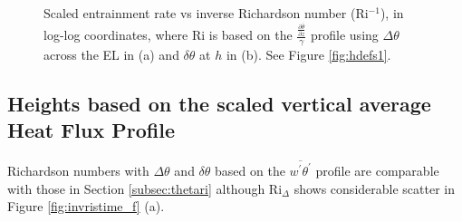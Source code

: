 \begin{figure}[htbp]
\begin{minipage}[b]{0.5\linewidth}
        \\
        \end{minipage}             
\quad
\begin{minipage}[b]{0.5\linewidth}
        \\       
       \end{minipage}
        \caption[Scaled entrainment rate vs inverse Richardson number (i)]{Scaled entrainment rate vs inverse Richardson number (\acs{Ri}$^{-1}$), in log-log coordinates, where \acs{Ri} is based on the $\frac{\frac{\partial \overline{\theta}}{\partial z}}{\gamma}$ profile using $\Delta \theta$ across the \acs{EL} in (a) and $\delta \theta$ at $h$ in (b). See Figure \ref{fig:hdefs1}.}
        \label{fig:weinvri}
\end{figure}

\clearpage

\subsection{Heights based on the scaled vertical average Heat Flux Profile}

Richardson numbers with $\Delta \theta$ and $\delta \theta$ based on the $\overline{w^{'}\theta^{'}}$ profile are comparable with those in Section \ref{subsec:thetari} although \acs{Ri}$_{\Delta}$ shows considerable scatter in Figure \ref{fig:invristime_f} (a).

